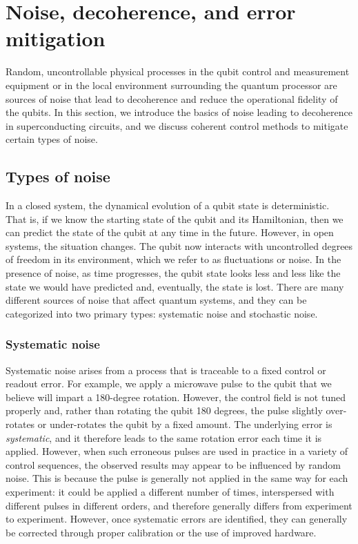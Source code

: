 \documentclass[aip,apr,twocolumn,showpacs,superscriptaddress,groupedaddress,nofootinbib,reprint]{revtex4-1}  %
\begin{document}
\section{\label{sec:Noise}Noise, decoherence, and error mitigation}

Random, uncontrollable physical processes in the qubit control and measurement equipment or in the local environment surrounding the quantum processor are sources of noise that lead to decoherence and reduce the operational fidelity of the qubits. In this section, we introduce the basics of noise leading to decoherence in superconducting circuits, and we discuss coherent control methods to mitigate certain types of noise.

\subsection{Types of noise}

In a closed system, the dynamical evolution of a qubit state is deterministic. That is, if we know the starting state of the qubit and its Hamiltonian, then we can predict the state of the qubit at any time in the future. However, in open systems, the situation changes. The qubit now interacts with uncontrolled degrees of freedom in its environment, which we refer to as fluctuations or noise. In the presence of noise, as time progresses, the qubit state looks less and less like the state we would have predicted and, eventually, the state is lost. There are many different sources of noise that affect quantum systems, and they can be categorized into two primary types: systematic noise and stochastic noise.

\subsubsection{Systematic noise}

Systematic noise arises from a process that is traceable to a fixed control or readout error. For example, we apply a microwave pulse to the qubit that we believe will impart a 180-degree rotation. However, the control field is not tuned properly and, rather than rotating the qubit 180 degrees, the pulse slightly over-rotates or under-rotates the qubit by a fixed amount. The underlying error is {\em systematic}, and it therefore leads to the same rotation error each time it is applied. However, when such erroneous pulses are used in practice in a variety of control sequences, the observed results may appear to be influenced by random noise. This is because the pulse is generally not applied in the same way for each experiment: it could be applied a different number of times, interspersed with different pulses in different orders, and therefore generally differs from experiment to experiment. However, once systematic errors are identified, they can generally be corrected through proper calibration or the use of improved hardware.
\end{document}

